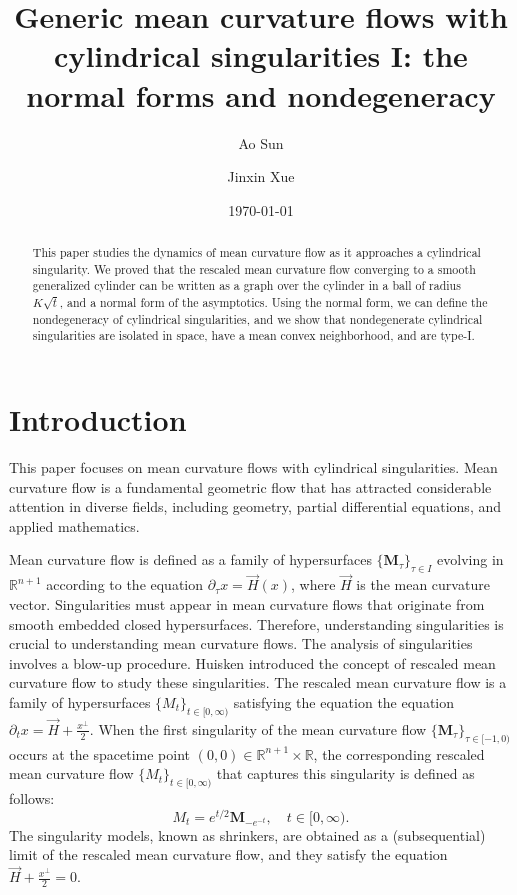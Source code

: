 \documentclass[11pt]{amsart}
\title[Cylindrical singularities I]{Generic mean curvature flows with cylindrical singularities I: the normal forms and nondegeneracy}
\author{Ao Sun}
\author{Jinxin Xue}
\date{\today}
\numberwithin{equation}{section}
\numberwithin{equation}{section}
\newcommand{\bM}{\mathbf{M}}
\newcommand{\R}{\mathbb{R}}
\newcommand{\pr}{\partial}
\begin{document}
	\maketitle
	\begin{abstract}
		This paper studies the dynamics of mean curvature flow as it approaches a cylindrical singularity. We proved that the rescaled mean curvature flow converging to a smooth generalized cylinder can be written as a graph over the cylinder in a ball of radius $K\sqrt{t}$, and a normal form of the asymptotics. Using the normal form, we can define the nondegeneracy of cylindrical singularities, and we show that nondegenerate cylindrical singularities are isolated in space, have a mean convex neighborhood, and are type-I. 
	\end{abstract}
	
	
	
	\section{Introduction}
	This paper focuses on mean curvature flows with cylindrical singularities. Mean curvature flow is a fundamental geometric flow that has attracted considerable attention in diverse fields, including geometry, partial differential equations, and applied mathematics.
	
	Mean curvature flow is defined as a family of hypersurfaces $\{\bM_\tau\}_{\tau\in I}$ evolving in $\mathbb{R}^{n+1}$ according to the equation $\pr_\tau x=\vec{H}(x)$, where $\vec H$ is the mean curvature vector. Singularities must appear in mean curvature flows that originate from smooth embedded closed hypersurfaces. Therefore, understanding singularities is crucial to understanding mean curvature flows. The analysis of singularities involves a blow-up procedure. Huisken \cite{Hu1} introduced the concept of rescaled mean curvature flow to study these singularities. The rescaled mean curvature flow is a family of hypersurfaces $\{M_t\}_{t\in[0,\infty)}$ satisfying the equation the equation
	$
	\pr_t x=\vec{H}+\frac{x^\perp}{2}.
	$
	When the first singularity of the mean curvature flow $\{\bM_\tau\}_{\tau\in[-1,0)}$ occurs at the spacetime point $(0,0)\in \R^{n+1}\times \R$, the corresponding rescaled mean curvature flow $\{M_t\}_{t\in[0,\infty)}$ that captures this singularity is defined as follows:
	\begin{equation}\label{EqMCFRMCF}
		M_t=e^{t/2}\bM_{-e^{-t}}, \quad t\in [0,\infty).
	\end{equation}
	The singularity models, known as shrinkers, are obtained as a (subsequential) limit of the rescaled mean curvature flow, and they satisfy the equation $\vec H+\frac{x^\perp}{2}=0$.
	
\end{document}
